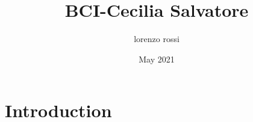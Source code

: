 \documentclass{article}
\title{BCI-Cecilia Salvatore}
\author{lorenzo rossi}
\date{May 2021}
\begin{document}
\maketitle

\section{Introduction}
\end{document}

